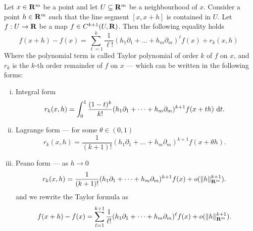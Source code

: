 \begin{theorem}\label{thm: taylor-poly-Rn}
    Let \(x \in \mathbf{R}^m\) be a point and let \(U \subseteq \mathbf{R}^m\) be a neighbourhood
    of \(x\). Consider a point \(h \in \mathbf{R}^m\) such that the line segment \([x, x +
            h]\) is contained in \(U\). Let \(f: U \to \mathbf{R}\) be a map \(f \in C^{k+1}(U, \mathbf{R})\).
    Then the following equality holds
    \[
        f(x + h) - f(x) = \sum_{\ell=1}^k
        \frac 1 {\ell!} (h_1 \partial_1 + \dots + h_m \partial_m)^\ell f(x)
        + r_k(x, h)
    \]
    Where the polynomial term is called Taylor polynomial of order \(k\) of \(f\)
    on \(x\), and \(r_k\) is the \(k\)-th order remainder of \(f\) on \(x\) ---
    which can be written in the following forms:
    \begin{enumerate}[(i)]
        \item Integral form
              \[
                  r_k(x, h) = \int_0^1 \frac{(1 - t)^k}{k!} (h_1 \partial_1 + \dots + h_m
                  \partial_m)^{k+1} f(x + th)\ \mathrm{d} t.
              \]
        \item Lagrange form --- for some \(\theta \in (0, 1)\)
              \[
                  r_k(x, h) = \frac 1 {(k + 1)!} (h_1 \partial_1 + \dots + h_m
                  \partial_m)^{k+1} f(x + \theta h).
              \]
        \item Peano form --- as \(h \to 0\)
              \[
                  r_k(x, h) = \frac 1 {(k + 1)!} (h_1 \partial_1 + \dots + h_m
                  \partial_m)^{k+1} f(x) + o(\lVert h\rVert_{\mathbf{R}^m}^{k+1}).
              \]
              and we rewrite the Taylor formula as
              \[
                  f(x + h) - f(x) = \sum_{\ell=1}^{k+1}
                  \frac 1 {\ell!} (h_1 \partial_1 + \dots + h_m \partial_m)^\ell f(x)
                  + o(\lVert h\rVert_{\mathbf{R}^m}^{k+1}).
              \]
    \end{enumerate}
\end{theorem}

